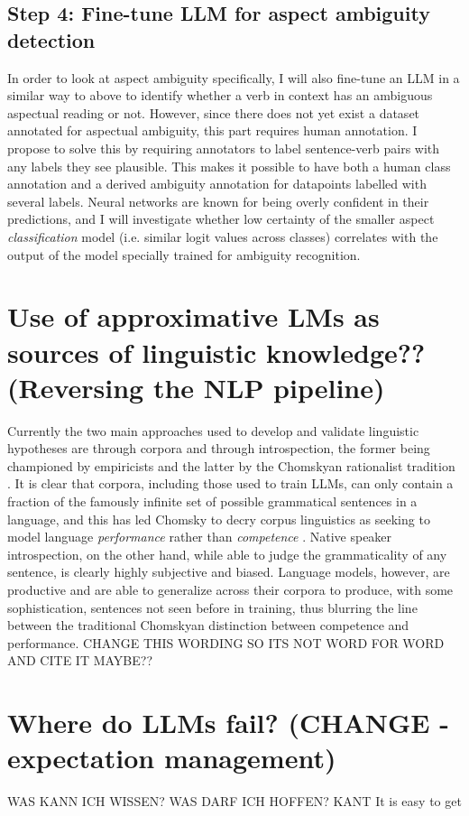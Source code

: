 \subsection*{Step 4: Fine-tune LLM for aspect ambiguity detection}
In order to look at aspect ambiguity specifically, I will also fine-tune an LLM in a similar way to above to identify whether a verb in context has an ambiguous aspectual reading or not. However, since there does not yet exist a dataset annotated for aspectual ambiguity, this part requires human annotation. I propose to solve this by requiring annotators to label sentence-verb pairs with any labels they see plausible. This makes it possible to have both a human class annotation and a derived ambiguity annotation for datapoints labelled with several labels. Neural networks are known for being overly confident in their predictions, and I will investigate whether low certainty of the smaller aspect \emph{classification} model (i.e. similar logit values across classes) correlates with the output of the model specially trained for ambiguity recognition.

\section{Use of approximative LMs as sources of linguistic knowledge?? (Reversing the NLP pipeline)}
Currently the two main approaches used to develop and validate linguistic hypotheses are through corpora and through introspection, the former being championed by empiricists and the latter by the Chomskyan rationalist tradition \citep{corpus_textbook}. It is clear that corpora, including those used to train LLMs, can only contain a fraction of the famously infinite set of possible grammatical sentences in a language, and this has led Chomsky to decry corpus linguistics as seeking to model language \emph{performance} rather than \emph{competence} \citep{corpus_textbook}. Native speaker introspection, on the other hand, while able to judge the grammaticality of any sentence, is clearly highly subjective and biased. Language models, however, are productive and are able to generalize across their corpora to produce, with some sophistication, sentences not seen before in training, thus blurring the line between the traditional Chomskyan distinction between competence and performance. CHANGE THIS WORDING SO ITS NOT WORD FOR WORD AND CITE IT MAYBE??
\section{Where do LLMs fail? (CHANGE - expectation management)} WAS KANN ICH WISSEN? WAS DARF ICH HOFFEN? KANT
It is easy to get 

